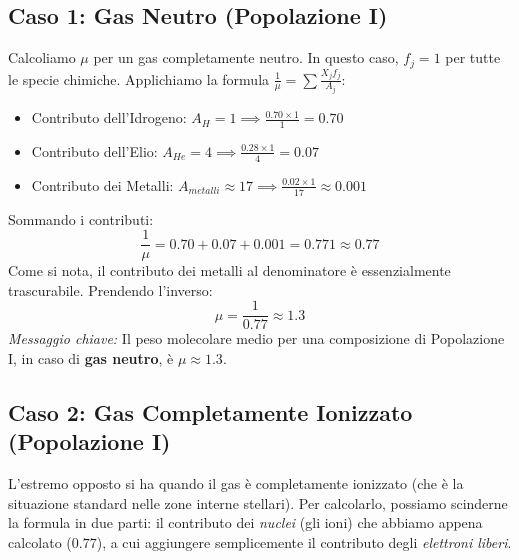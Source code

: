 \subsection{Caso 1: Gas Neutro (Popolazione I)}
Calcoliamo $\mu$ per un gas completamente neutro. In questo caso, $f_j = 1$ per tutte le specie chimiche. Applichiamo la formula $\frac{1}{\mu} = \sum \frac{X_j f_j}{A_j}$:
\begin{itemize}
\item Contributo dell'Idrogeno: $A_H = 1 \implies \frac{0.70 \times 1}{1} = 0.70$
\item Contributo dell'Elio: $A_{He} = 4 \implies \frac{0.28 \times 1}{4} = 0.07$
\item Contributo dei Metalli: $A_{metalli} \approx 17 \implies \frac{0.02 \times 1}{17} \approx 0.001$
\end{itemize}
Sommando i contributi:
\begin{equation}
\frac{1}{\mu} = 0.70 + 0.07 + 0.001 = 0.771 \approx 0.77
\end{equation}
Come si nota, il contributo dei metalli al denominatore è essenzialmente trascurabile. Prendendo l'inverso:
\begin{equation}
\mu = \frac{1}{0.77} \approx 1.3
\end{equation}
\textit{Messaggio chiave:} Il peso molecolare medio per una composizione di Popolazione I, in caso di \textbf{gas neutro}, è $\mu \approx 1.3$.

\subsection{Caso 2: Gas Completamente Ionizzato (Popolazione I)}
L'estremo opposto si ha quando il gas è completamente ionizzato (che è la situazione standard nelle zone interne stellari). Per calcolarlo, possiamo scinderne la formula in due parti: il contributo dei \textit{nuclei} (gli ioni) che abbiamo appena calcolato ($0.77$), a cui aggiungere semplicemente il contributo degli \textit{elettroni liberi}.

